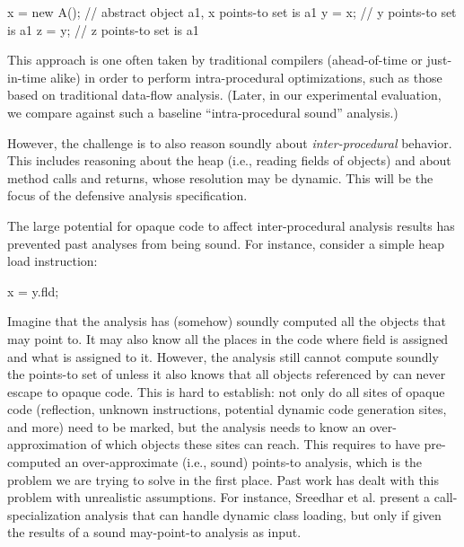 \vspace{-3mm}\begin{minipage}[l]{5.1in}
\begin{javacodeNoLines}
x = new A();  // abstract object a1, x points-to set is {a1}
y = x;  // y points-to set is {a1}
z = y;  // z points-to set is {a1}
\end{javacodeNoLines}
\end{minipage}

This approach is one often taken by traditional compilers
(ahead-of-time or just-in-time alike) in order to perform
intra-procedural optimizations, such as those based on traditional
data-flow analysis. (Later, in our experimental evaluation, we compare
against such a baseline ``intra-procedural sound'' analysis.)

However, the challenge is to also reason soundly about
\emph{inter-procedural} behavior. This includes reasoning about the
heap (i.e., reading fields of objects) and about method calls and
returns, whose resolution may be dynamic. This will be the focus of
the defensive analysis specification.

The large potential for opaque code to affect inter-procedural
analysis results has prevented past analyses from being sound. For
instance, consider a simple heap load instruction:

\vspace{-3mm}\begin{minipage}[l]{5.1in}
\begin{javacodeNoLines}
x = y.fld;
\end{javacodeNoLines}
\end{minipage}

\noindent Imagine that the analysis has (somehow) soundly computed all
the objects that  may point to. It may also know all the places
in the code where field  is assigned and what is
assigned to it. However, the analysis still cannot compute soundly the
points-to set of  unless it also knows that all objects
referenced by  can never escape to opaque code. This is
hard to establish: not only do all sites of opaque code
(reflection, unknown instructions, potential dynamic code generation
sites, and more) need to be marked, but the analysis needs to know an
over-approximation of which objects these sites can reach. This
requires to have pre-computed an over-approximate (i.e., sound)
points-to analysis, which is the problem we are trying to solve in the
first place. Past work has dealt with this problem with unrealistic
assumptions. For instance,
Sreedhar et al. \cite{pldi:2000:Sreedhar} present a
call-specialization analysis that can handle dynamic class loading,
but only if given the results of a sound may-point-to analysis as
input.


